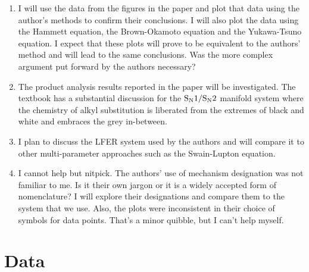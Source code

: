 \documentclass{tufte-handout}
\begin{document}
\begin{enumerate}



\item I will use the data from the figures in the paper and plot that data using the author's methods to confirm their conclusions. I will also plot the data using the Hammett equation, the Brown-Okamoto equation and the Yukawa-Tsuno equation. I expect that these plots will prove to be equivalent to the authors' method and will lead to the same conclusions. Was the more complex argument put forward by the authors necessary?

\item The product analysis results reported in the paper will be investigated. The textbook has a substantial discussion for the $\rm S_N1 / S_N2$ manifold system where the chemistry of alkyl substitution is liberated from the extremes of black and white and embraces the grey in-between. 

\item I plan to discuss the LFER system used by the authors and will compare it to other multi-parameter approaches such as the Swain-Lupton equation.  

\item I cannot help but nitpick. The authors' use of mechanism designation was not familiar to me. Is it their own jargon or it is a widely accepted form of nomenclature? I will explore their designations and compare them to the system that we use. Also, the plots were inconsistent in their choice of symbols for data points. That's a minor quibble, but I can't help myself.
\end{enumerate}



\section{Data}
\end{document}

